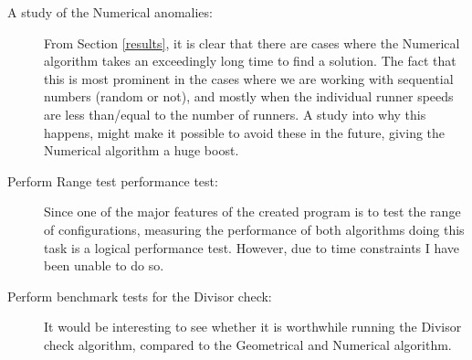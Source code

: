 \begin{description}
\item[A study of the Numerical anomalies:] From Section \ref{results}, it is clear that there are cases where the Numerical algorithm takes an exceedingly long time to find a solution. The fact that this is most prominent in the cases where we are working with sequential numbers (random or not), and mostly when the individual runner speeds are less than/equal to the number of runners. A study into why this happens, might make it possible to avoid these in the future, giving the Numerical algorithm a huge boost.

\item[Perform Range test performance test:] Since one of the major features of the created program is to test the range of configurations, measuring the performance of both algorithms doing this task is a logical performance test. However, due to time constraints I have been unable to do so.

\item[Perform benchmark tests for the Divisor check:] It would be interesting to see whether it is worthwhile running the Divisor check algorithm, compared to the Geometrical and Numerical algorithm.
\end{description}
